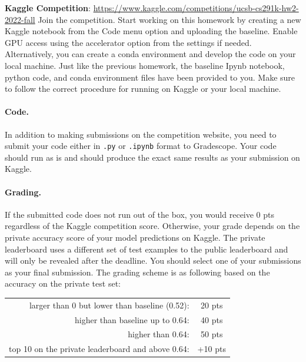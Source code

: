 \documentclass[11pt]{article}\pagestyle{plain}
\begin{document}
\textbf{Kaggle Competition}: \url{https://www.kaggle.com/competitions/ucsb-cs291k-hw2-2022-fall}
Join the competition. Start working on this homework by creating a new Kaggle notebook from the Code menu option and uploading the baseline. Enable GPU access using the accelerator option from the settings if needed. Alternatively, you can create a conda environment and develop the code on your local machine. Just like the previous homework, the baseline Ipynb notebook, python code, and conda environment files have been provided to you. Make sure to follow the correct procedure for running on Kaggle or your local machine. 

\paragraph{Code.} In addition to making submissions on the competition website, you need to submit your code either in \verb|.py| or \verb|.ipynb| format to Gradescope. Your code should run as is and should produce the exact same results as your submission on Kaggle.

\paragraph{Grading.} If the submitted code does not run out of the box, you would receive 0 pts regardless of the Kaggle competition score. Otherwise, your grade depends on the private accuracy score of your model predictions on Kaggle. The private leaderboard uses a different set of test examples to the public leaderboard and will only be revealed after the deadline. You should select one of your submissions as your final submission. The grading scheme is as following based on the accuracy on the private test set:

\begin{center}
	\begin{tabular}{rc}
		larger than 0 but lower than baseline (0.52): & 20 pts \\
		higher than baseline up to 0.64: & 40 pts \\
		higher than 0.64: & 50 pts \\
		top 10  on the private leaderboard and above 0.64: & +10 pts
	\end{tabular}
\end{center}
\end{document}
